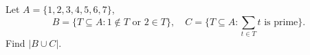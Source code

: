 Let $A=\{1,2,3,4,5,6,7\}$,
\[
B=\{T\subseteq A:1\notin T\text{ or }2\in T\},
\quad C=\{T\subseteq A:\textstyle\sum_{t\in T}t\text{ is prime}\}.
\]
Find $|B\cup C|$.
